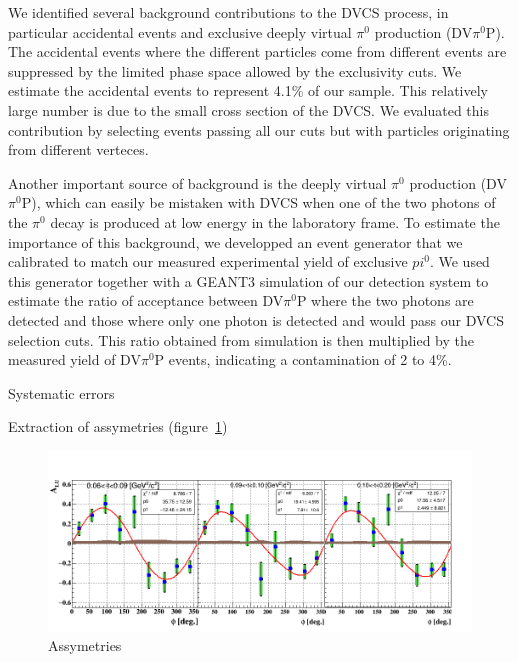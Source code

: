 \documentclass[%
 reprint,
 amsmath,amssymb,
 aps,
]{revtex4-1}
\begin{document}
We identified several background contributions to the DVCS process, in 
particular accidental events and exclusive deeply virtual 
$\pi^0$ production (DV$\pi^0$P). The accidental
events where the different particles come from different events are 
suppressed by the limited phase space allowed by the exclusivity cuts. We 
estimate the accidental events to represent 4.1\% of our sample. This relatively 
large number is due to the small cross section of the DVCS. We evaluated this contribution by
selecting events passing all our cuts but with particles originating from 
different verteces. 

Another important source of background is the deeply virtual 
$\pi^0$ production (DV$\pi^0$P), which can easily be mistaken
with DVCS when one of the two photons of the $\pi^0$ decay is produced at
low energy in the laboratory frame. To estimate the importance of
this background, we developped an event generator 
that we calibrated to match our measured experimental yield of exclusive 
$pi^0$. We used this generator together 
with a GEANT3 simulation of our detection system to estimate the ratio 
of acceptance between DV$\pi^0$P where the two photons are detected and those
where only one photon is detected and would pass our 
DVCS selection cuts. This ratio obtained from simulation is then multiplied by 
the measured yield of DV$\pi^0$P events, indicating a contamination of 2 to 4\%. 

Systematic errors


Extraction of assymetries (figure~\ref{fig:assym})

\begin{figure}[htbp]
\caption{\label{fig:assym} Assymetries}
\includegraphics[width=14cm]{coh_alu_t_phi.png}
\end{figure}
\end{document}
